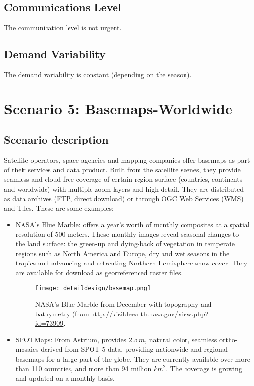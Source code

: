 \subsection{Communications Level}
The communication level is not urgent.
\subsection{Demand Variability}
The demand variability is constant (depending on the season).

\section{Scenario 5: Basemaps-Worldwide}
\subsection{Scenario description}
Satellite operators, space agencies and mapping companies offer basemaps as part of their services and data product. Built from the satellite scenes, they provide seamless and cloud-free coverage of certain region surface (countries, continents and worldwide) with multiple zoom layers and high detail. They are distributed as data archives (\ac{FTP}, direct download) or through OGC Web Services (\ac{WMS}) and Tiles. These are some examples:
\begin{itemize}
\item NASA's Blue Marble: offers a year's worth of monthly composites at a spatial resolution of 500 meters. These monthly images reveal seasonal changes to the land surface: the green-up and dying-back of vegetation in temperate regions such as North America and Europe, dry and wet seasons in the tropics and advancing and retreating Northern Hemisphere snow cover. They are available for download as georreferenced raster files. 

\begin{figure}[!h]
\begin{center}
\texttt{[image: detaildesign/basemap.png]}
\caption[NASA's Blue Marble from December with topography and bathymetry]{NASA's Blue Marble from December with topography and bathymetry (from \url{http://visibleearth.nasa.gov/view.php?id=73909}.}
\label{fig:basemap}
\end{center}
\end{figure}
\item SPOTMaps: From Astrium, provides $2.5~m$, natural color, seamless
  ortho-mosaics derived from SPOT 5 data, providing nationwide and regional
  basemaps for a large part of the globe. They are currently available over more
  than 110 countries, and more than 94 million $km^2$. The coverage is growing
  and updated on a monthly basis.
\end{itemize}

